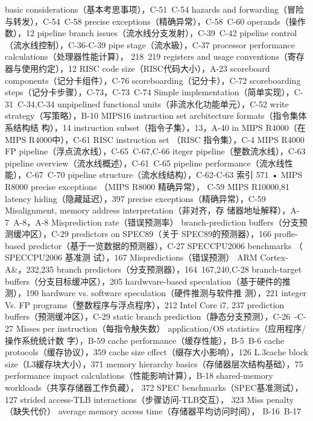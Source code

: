 basic considerations（基本考思事项），C-51~C-54
hazards and forwarding（冒险与转发），C-54~C-58
precise exceptions（精确异常），C-58~C-60
operands（操作数），12
pipeline branch issues（流水线分支发射），C-39~C-42
pipeline control（流水线控制），C-36-C-39
pipe stage（流水級），C-37
processor performance calculations（处理器性能计算），
218~219
registers and usage conventions（寄存器与使用约定），12
RISC code size（RISC代码大小），A-23
scoreboard components（记分卡组件），C-76
scoreboarding（记分卡），C-72
scoreboarding steps（记分卡步骤），C-73，C-73~C-74
Simple implementation（简单实现），C-31~C-34,C-34
unpipelined functional units（非流水化功能单元），C-52
write strategy（写策略），B-10
MIPS16
instruction set arcbitecture formats（指令集体系结构结
构），14
instruction subset（指令子集），13，A-40
in MIPS R4000（在 MIPS R4000中），C-61
RISC instruction set （RISC 指令集），C-4
MIPS R4000
FP pipeline（浮点流水线），C-65~C-67,C-66
iteger pipeline（整数流水线），C-63
pipeline overview（流水线概述），C-61~C-65
pipeline performance（流水线性能），C-67~C-70
pipeline structure（流水线结构），C-62-C-63
索引
571
• MIPS R8000 precise exceptions （MIPS R8000 精确异常），
C-59
MIPS R10000,81
latency hiding（隐藏延迟），397
precise exceptions（精确异常），C-59
Misalignment, memory address interpretation（非对齐，存
储器地址解释），A-7~A-8，A-8
Misprediction rate（错误预测率）
branch-prediction buffers（分支预测缓冲区），C-29
predictors on SPEC89（关于 SPEC89的预测器），166
profle-based predictor（基于一览数据的预测器），C-27
SPECCPU2006 benchmarks （ SPECCPU2006 基准测
试），167
Mispredictions（错误预测）
ARM Cortex-A&，232,235
branch predictors（分支预测器），164~167,240,C-28
branch-target buffers（分支目标缓冲区），205
hardwvare-based speculation（基于硬件的推测），190
hardware vs. software speculation（硬件推测与软件推
测），221
integer Vs. FP programs（整数程序与浮点程序），212
Intel Core i7, 237
prediction buffers（预测缓冲区），C-29
static branch prediction（静态分支预测），C-26~-C-27
Misses per instruction（每指令觖失数）
application/OS statistics（应用程序/操作系统统计数
字），B-59
cache performance（缓存性能），B-5~B-6
cache protocols（缓存协议），359
cache size cffect（缀存大小影响），126
L.3cache block size（L3緩存块大小），371
memory hierarchy basics（存储器层次结构基础），75
performance impact calculations（性能影响计算），B-18
shared-memory workloads（共享存储器工作负藏），
372
SPEC benchmarks（SPEC基准测试），127
strided access-TLB interactions（步骤访问-TLB交互），
323
Miss penalty（缺失代价）
average memory access time（存储器平均访问时间），
B-16~B-17
